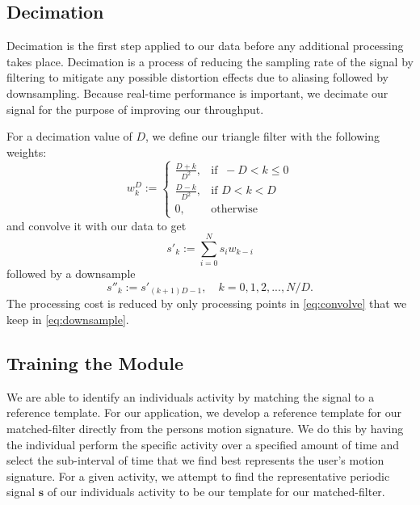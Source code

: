 \documentclass[journal]{IEEEtran}
\begin{document}
\subsection{Decimation}
Decimation is the first step applied to our data before any additional processing takes place.
Decimation is a process of reducing the sampling rate of the signal by filtering to mitigate any possible distortion effects due to aliasing followed by downsampling.
Because real-time performance is important, we decimate our signal for the purpose of improving our throughput.

For a decimation value of $D$, we define our triangle filter with the following weights:
%
\begin{equation} \label{eq:triangle_filter_weights}
w_k^D :=
\begin{cases}
  \frac{D+k}{D^2}, & \text{if }\ -D < k \leq 0 \\
  \frac{D-k}{D^2}, & \text{if } D < k < D \\
  0, & \text{otherwise}
\end{cases}
\end{equation}
%
and convolve it with our data to get
%
\begin{equation} \label{eq:convolve}
s'_k := \sum_{i=0}^{N} s_i w_{k-i}
\end{equation}
%
followed by a downsample
%
\begin{equation} \label{eq:downsample}
s''_k := s'_{(k+1)D-1}, \quad k = 0, 1, 2, ..., N/D.
\end{equation}
%
The processing cost is reduced by only processing points in \eqref{eq:convolve} that we keep in \eqref{eq:downsample}.
%
\subsection{Training the Module} \label{sec:training}
We are able to identify an individual\textquotesingle s activity by matching the signal to a reference template.
For our application, we develop a reference template for our matched-filter directly from the person\textquotesingle s motion signature.
We do this by having the individual perform the specific activity over a specified amount of time and select the sub-interval of time that we find best represents the user's motion signature.
For a given activity, we attempt to find the representative periodic signal $\textbf{s}$ of our individual\textquotesingle s activity to be our template for our matched-filter.
\end{document}

